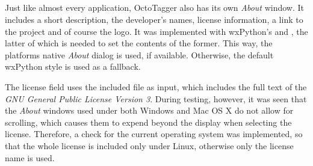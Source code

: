\subsection{}
\def\kapitelautor{Erik Ritschl}

Just like almost every application, OctoTagger also has its own \emph{About} window. It includes  a short description, the developer's names, license information, a link to the project and of course the logo. 
It was implemented with wxPython's  and , the latter of which is needed to set the contents of the former. This way, the platforms native \emph{About} dialog is used, if available. Otherwise, the default wxPython style is used as a fallback. 

The license field uses the included  file as input, which includes the full text of the \emph{GNU General Public License Version 3}. %
During testing, however, it was seen that the \emph{About} windows used under both Windows and Mac OS X do not allow for scrolling, which causes them to expend beyond the display when selecting the license. Therefore, a check for the current operating system was implemented, so that the whole license is included only under Linux, otherwise only the license name is used.